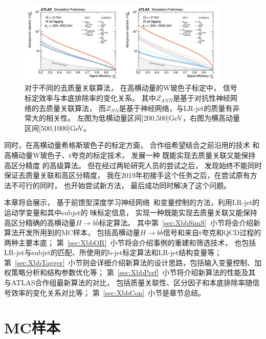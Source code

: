\begin{figure}
  \begin{center}
    \includegraphics[width=0.9\textwidth]{figuresXbb/ANN.jpg}
  \end{center}
  \caption{对于不同的去质量关联算法，%
在高横动量的W玻色子标定中，
  信号标定效率与本底排除率的变化关系。
其中$Z_{ANN}$是基于对抗性神经网络的去质量关联算法，
而$Z_{NN}$是基于神经网络，与LR-jet的质量有非常大的相关性。
左图为低横动量区间[200,500]GeV，右图为横高动量区间[500,1000]GeV。
}
    \label{fig:ANNROC}
\end{figure}


同时，在高横动量希格斯玻色子的标定方面，
合作组希望结合之前沿用的技术
和高横动量W玻色子、t夸克的标定技术，
发展一种
既能实现去质量关联又能保持
高区分精度
的高级算法。
但在经过两轮研究人员的尝试之后，
发现始终不能同时保证去质量关联和高区分精度，
我在2019年初接手这个任务之后，在尝试原有方法不可行的同时，
也开始尝试新方法，
最后成功同时解决了这个问题。

本章将会展示，
基于前馈型深度学习神经网络~\cite{FDNN}和变量控制的方法，利用LR-jet的运动学变量和其中subjet的
味标定信息，
实现一种既能实现去质量关联又能保持高区分精确的高横动量$H\rightarrow b\bar{b}$标定算法。
其中第~\ref{sec:XbbSimS}~小节将会介绍新算法开发所用到的MC样本，
包括高横动量$H\rightarrow b\bar{b}$信号和来自t夸克和QCD过程的两种主要本底；
第~\ref{sec:XbbOR}~小节将会介绍事例的重建和筛选技术，
也包括LR-jet与subjet的匹配、所使用的b-jet标定算法和LR-jet结构变量等；
第~\ref{sec:XbbTagger}~小节则会详细介绍新算法的设计思路，包括输入变量控制、加权策略分析和结构参数优化等；
第~\ref{sec:XbbPerf}~小节将介绍新算法的性能及其与ATLAS合作组最新算法的对比，
包括质量关联性、区分因子和本底排除率随信号效率的变化关系对比等；
第~\ref{sec:XbbCon}~小节是章节总结。


\section{MC样本}
\label{sec:XbbSim}

